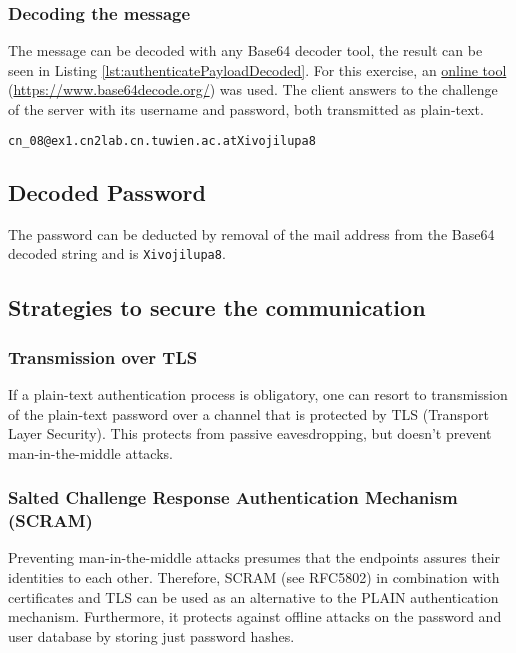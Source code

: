 \documentclass[parskip=full]{scrartcl}
\begin{document}
\subsubsection{Decoding the message}
The message can be decoded with any Base64 decoder tool, the result can be seen in Listing \ref{lst:authenticatePayloadDecoded}.
For this exercise, an \href{https://www.base64decode.org/}{online tool} (\url{https://www.base64decode.org/}) was used.
The client answers to the challenge of the server with its username and password, both transmitted as plain-text.
\begin{lstlisting}[language=tex, breaklines, frame=single, caption={Base64 decoded message}, label=lst:authenticatePayloadDecoded, float, floatplacement=h]
cn_08@ex1.cn2lab.cn.tuwien.ac.atXivojilupa8
\end{lstlisting}

\subsection{Decoded Password}
The password can be deducted by removal of the mail address from the Base64 decoded string and is \texttt{Xivojilupa8}.

\subsection{Strategies to secure the communication}
\subsubsection{Transmission over TLS}
If a plain-text authentication process is obligatory, one can resort to transmission of the plain-text password over a channel that is protected by TLS (Transport Layer Security). 
This protects from passive eavesdropping, but doesn't prevent man-in-the-middle attacks.

\subsubsection{Salted Challenge Response Authentication Mechanism (SCRAM)}
Preventing man-in-the-middle attacks presumes that the endpoints assures their identities to each other.
Therefore, SCRAM (see RFC5802) in combination with certificates and TLS can be used as an alternative to the PLAIN authentication mechanism.
Furthermore, it protects against offline attacks on the password and user database by storing just password hashes. 
\end{document}
